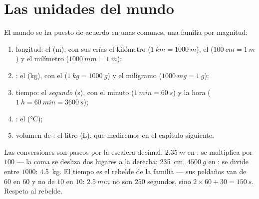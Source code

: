\section{Las unidades del mundo}

\begin{definition}\label{def:g6:measurement-in-science:units}
El mundo se ha puesto de acuerdo en unas  comunes, una
familia por magnitud:
\begin{enumerate}
  \item longitud: el \emph{} (\unit{m}), con sus crías el
        kilómetro ($\qty{1}{km} = \qty{1000}{m}$), el
         ($\qty{100}{cm} = \qty{1}{m}$) y el milímetro
        ($\qty{1000}{mm} = \qty{1}{m}$);
  \item {}: el \emph{} (\unit{kg}), con el 
        ($\qty{1}{kg} = \qty{1000}{g}$) y el miligramo
        ($\qty{1000}{mg} = \qty{1}{g}$);
  \item tiempo: el \emph{segundo} (\unit{s}), con el minuto
        ($\qty{1}{min} = \qty{60}{s}$) y la hora
        ($\qty{1}{h} = \qty{60}{min} = \qty{3600}{s}$);
  \item {}: el  (\unit{\celsius});
  \item volumen de : el litro (\unit{L}), que
        mediremos en el capítulo siguiente.
\end{enumerate}
\end{definition}

\begin{example}\label{ex:g6:measurement-in-science:convert}
Las conversiones son paseos por la escalera decimal.
$\qty{2.35}{m}$ en : se multiplica por $100$ --- la coma
se desliza dos lugares a la derecha: \qty{235}{cm}. $\qty{4500}{g}$ en
: se divide entre $1000$: \qty{4.5}{kg}. El tiempo es el
rebelde de la familia --- sus peldaños van de $60$ en $60$ y no de
$10$ en $10$: $\qty{2.5}{min}$ no son $250$ segundos, sino
$2 \times 60 + 30 = \qty{150}{s}$. Respeta al rebelde.
\end{example}

